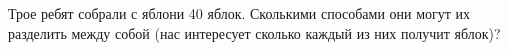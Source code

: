 \question
Трое ребят собрали с яблони 40 яблок. Сколькими способами они могут их разделить между собой (нас интересует сколько каждый из них получит яблок)?
